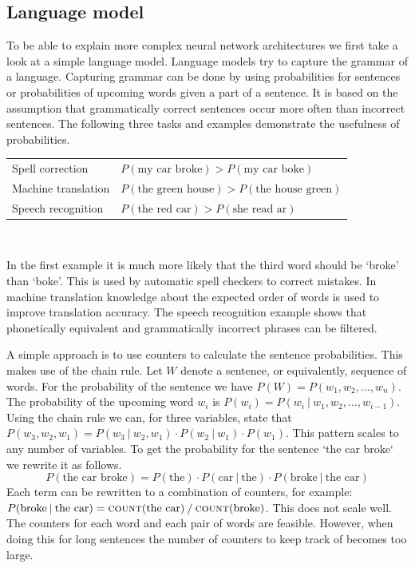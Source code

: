 \subsection{Language model}
\label{subsec:language_model}
To be able to explain more complex neural network architectures we first take a look at a simple language model.
Language models try to capture the grammar of a language.
Capturing grammar can be done by using probabilities for sentences or probabilities of upcoming words given a part of a sentence.
It is based on the assumption that grammatically correct sentences occur more often than incorrect sentences.
The following three tasks and examples demonstrate the usefulness of probabilities.
\begin{center}
    \begin{tabular}{l l}
        Spell correction & $P(\text{my car broke}) > P(\text{my car boke})$\\
        Machine translation & $P(\text{the green house}) > P(\text{the house green})$\\
        Speech recognition & $P(\text{the red car}) > P(\text{she read ar})$
    \end{tabular}\\
\end{center}
In the first example it is much more likely that the third word should be `broke' than `boke'.
This is used by automatic spell checkers to correct mistakes.
In machine translation knowledge about the expected order of words is used to improve translation accuracy.
The speech recognition example shows that phonetically equivalent and grammatically incorrect phrases can be filtered.

A simple approach is to use counters to calculate the sentence probabilities.
This makes use of the chain rule.
Let $W$ denote a sentence, or equivalently, sequence of words.
For the probability of the sentence we have $P(W) = P(w_1, w_2, \ldots, w_n)$.
The probability of the upcoming word $w_i$ is $P(w_i) = P(w_i \: | \: w_1, w_2, \ldots, w_{i-1})$.
Using the chain rule we can, for three variables, state that $P(w_3, w_2, w_1) = P(w_3 \: | \: w_2, w_1) \cdot P(w_2 \: | \: w_1) \cdot P(w_1)$.
This pattern scales to any number of variables.
To get the probability for the sentence `the car broke` we rewrite it as follows.
\[ P(\text{the car broke}) = P(\text{the}) \cdot P(\text{car} \: | \: \text{the}) \cdot P(\text{broke} \: | \: \text{the car}) \]
Each term can be rewritten to a combination of counters, for example: $P(\text{broke} \: | \: \text{the car}) = \textsc{count}(\text{the car}) \: / \: \textsc{count}(\text{broke})$.
This does not scale well.
The counters for each word and each pair of words are feasible.
However, when doing this for long sentences the number of counters to keep track of becomes too large.

